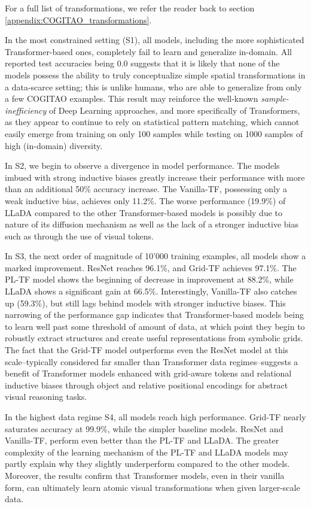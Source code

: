 For a full list of transformations, we refer the reader back to section \ref{appendix:COGITAO_transformations}. 

In the most constrained setting (S1), all models, including the more sophisticated Transformer-based ones, completely fail to learn and generalize in-domain. All reported test accuracies being 0.0 suggests that it is likely that none of the models possess the ability to truly conceptualize simple spatial transformations in a data-scarce setting; this is unlike humans, who are able to generalize from only a few COGITAO examples. This result may reinforce the well-known \textit{sample-inefficiency} of Deep Learning approaches, and more specifically of Transformers, as they appear to continue to rely on statistical pattern matching, which cannot easily emerge from training on only 100 samples while testing on 1000 samples of high (in-domain) diversity. 

In S2, we begin to observe a divergence in model performance. The models imbued with strong inductive biases greatly increase their performance with more than an additional 50\% accuracy increase. The Vanilla-TF, possessing only a weak inductive bias, achieves only 11.2\%. The worse performance (19.9\%) of LLaDA compared to the other Transformer-based models is possibly due to nature of its diffusion mechanism as well as the lack of a stronger inductive bias such as through the use of visual tokens. 

In S3, the next order of magnitude of 10'000 training examples, all models show a marked improvement. ResNet reaches 96.1\%, and Grid-TF achieves 97.1\%. The PL-TF model shows the beginning of decrease in improvement at 88.2\%, while LLaDA shows a significant gain at 66.5\%. Interestingly, Vanilla-TF also catches up (59.3\%), but still lags behind models with stronger inductive biases. This narrowing of the performance gap indicates that Transformer-based models being to learn well past some threshold of amount of data, at which point they begin to robustly extract structures and create useful representations from symbolic grids. The fact that the Grid-TF model outperforms even the ResNet model at this scale--typically considered far smaller than Transformer data regimes--suggests a benefit of Transformer models enhanced with grid-aware tokens and relational inductive biases through object and relative positional encodings for abstract visual reasoning tasks.

In the highest data regime S4, all models reach high performance. Grid-TF nearly saturates accuracy at 99.9\%, while the simpler baseline models. ResNet and Vanilla-TF, perform even better than the PL-TF and LLaDA. The greater complexity of the learning mechanism of the PL-TF and LLaDA models may partly explain why they slightly underperform compared to the other models. Moreover, the results confirm that Transformer models, even in their vanilla form, can ultimately learn atomic visual transformations when given larger-scale data.

